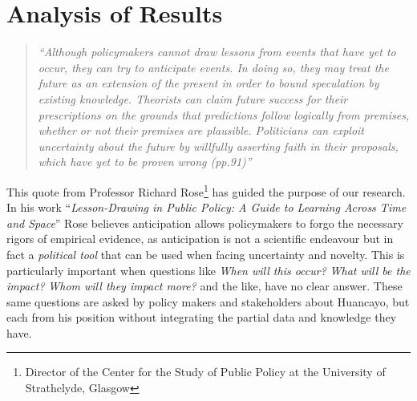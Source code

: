 \documentclass{article}
\begin{document}
\section{Analysis of Results}


\begin{quote}
\emph{``Although policymakers cannot draw lessons from events that have yet to occur, they can try to anticipate events. In doing so, they may treat the future as an extension of the present in order to bound speculation by existing knowledge. Theorists can claim future success for their prescriptions on the grounds that predictions follow logically from premises, whether or not their premises are plausible. Politicians can exploit uncertainty about the future by willfully asserting faith in their proposals, which have yet to be proven wrong (pp.91)''\cite{rose_lesson-drawing_1993}}
\end{quote}

This quote from Professor Richard Rose\footnote{Director of the Center for the Study of Public Policy at the University of Strathclyde, Glasgow} has guided the purpose of our research. In his work ``\emph{Lesson-Drawing in Public Policy: A Guide to Learning Across Time and Space}'' Rose believes anticipation allows policymakers to forgo the necessary rigors of empirical evidence, as anticipation is not a scientific endeavour but in fact a \emph{political tool} that can be used when facing uncertainty and novelty. This is particularly important when questions like \emph{When will this occur?} \emph{What will be the impact?} \emph{Whom will they impact more?}  and the like, have no clear answer. These same questions are asked by policy makers and stakeholders about Huancayo, but each from his position without integrating the partial data and knowledge they have.
\end{document}
